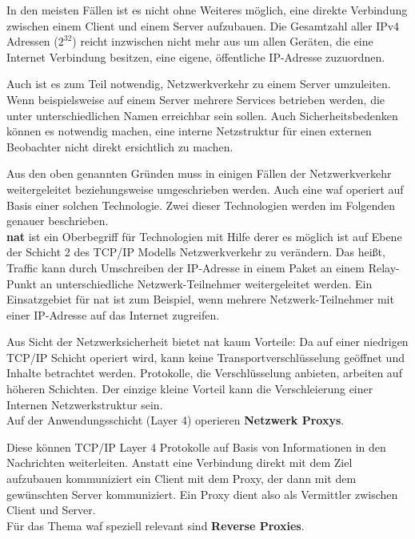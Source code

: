In den meisten Fällen ist es nicht ohne Weiteres möglich, eine direkte Verbindung zwischen einem Client und einem Server aufzubauen.
Die Gesamtzahl aller IPv4 Adressen ($2^{32}$) reicht inzwischen nicht mehr aus um allen Geräten, die eine Internet Verbindung besitzen, eine eigene, öffentliche IP-Adresse zuzuordnen.

Auch ist es zum Teil notwendig, Netzwerkverkehr zu einem Server umzuleiten.
Wenn beispielsweise auf einem Server mehrere Services betrieben werden, die unter unterschiedlichen Namen erreichbar sein sollen.
Auch Sicherheitsbedenken können es notwendig machen, eine interne Netzstruktur für einen externen Beobachter nicht direkt ersichtlich zu machen.

Aus den oben genannten Gründen muss in einigen Fällen der Netzwerkverkehr weitergeleitet beziehungsweise umgeschrieben werden.
Auch eine \ac{waf} operiert auf Basis einer solchen Technologie.
Zwei dieser Technologien werden im Folgenden genauer beschrieben.\\

\textbf{\ac{nat}} ist ein Oberbegriff für Technologien mit Hilfe derer es möglich ist auf Ebene der Schicht 2 des TCP/IP Modells Netzwerkverkehr zu verändern.
Das heißt, Traffic kann durch Umschreiben der IP-Adresse in einem Paket an einem Relay-Punkt an unterschiedliche Netzwerk-Teilnehmer weitergeleitet werden.
Ein Einsatzgebiet für \ac{nat} ist zum Beispiel, wenn mehrere Netzwerk-Teilnehmer mit einer IP-Adresse auf das Internet zugreifen.

Aus Sicht der Netzwerksicherheit bietet \ac{nat} kaum Vorteile:
Da auf einer niedrigen TCP/IP Schicht operiert wird, kann keine Transportverschlüsselung geöffnet und Inhalte betrachtet werden.
Protokolle, die Verschlüsselung anbieten, arbeiten auf höheren Schichten.
Der einzige kleine Vorteil kann die Verschleierung einer Internen Netzwerkstruktur sein\cite{NATNetworkAddress}.\\

Auf der Anwendungsschicht (Layer 4) operieren \textbf{Netzwerk Proxys}.

Diese können TCP/IP Layer 4 Protokolle auf Basis von Informationen in den Nachrichten weiterleiten.
Anstatt eine Verbindung direkt mit dem Ziel aufzubauen kommuniziert ein Client mit dem Proxy, der dann mit dem gewünschten Server kommuniziert.
Ein Proxy dient also als Vermittler zwischen Client und Server.\\

Für das Thema \ac{waf} speziell relevant sind \textbf{Reverse Proxies}.

